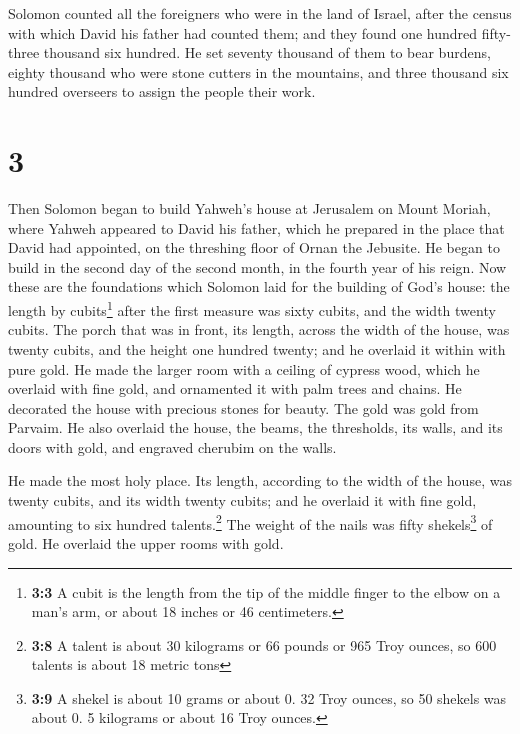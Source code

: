  Solomon counted all the foreigners who were in the land
of Israel, after the census with which David his father had counted
them; and they found one hundred fifty-three thousand six hundred.
 He set seventy thousand of them to bear burdens, eighty
thousand who were stone cutters in the mountains, and three thousand six
hundred overseers to assign the people their work.

\hypertarget{section-2}{%
\section{3}\label{section-2}}

 Then Solomon began to build Yahweh's house at Jerusalem
on Mount Moriah, where Yahweh appeared to David his father, which he
prepared in the place that David had appointed, on the threshing floor
of Ornan the Jebusite.  He began to build in the second
day of the second month, in the fourth year of his reign. 
Now these are the foundations which Solomon laid for the building of
God's house: the length by cubits\footnote{\textbf{3:3} A cubit is the
  length from the tip of the middle finger to the elbow on a man's arm,
  or about 18 inches or 46 centimeters.} after the first measure was
sixty cubits, and the width twenty cubits.  The porch that
was in front, its length, across the width of the house, was twenty
cubits, and the height one hundred twenty; and he overlaid it within
with pure gold.  He made the larger room with a ceiling of
cypress wood, which he overlaid with fine gold, and ornamented it with
palm trees and chains.  He decorated the house with
precious stones for beauty. The gold was gold from Parvaim.
 He also overlaid the house, the beams, the thresholds,
its walls, and its doors with gold, and engraved cherubim on the walls.

 He made the most holy place. Its length, according to the
width of the house, was twenty cubits, and its width twenty cubits; and
he overlaid it with fine gold, amounting to six hundred
talents.\footnote{\textbf{3:8} A talent is about 30 kilograms or 66
  pounds or 965 Troy ounces, so 600 talents is about 18 metric tons}
 The weight of the nails was fifty shekels\footnote{\textbf{3:9}
  A shekel is about 10 grams or about 0. 32 Troy ounces, so 50 shekels
  was about 0. 5 kilograms or about 16 Troy ounces.} of gold. He
overlaid the upper rooms with gold.

